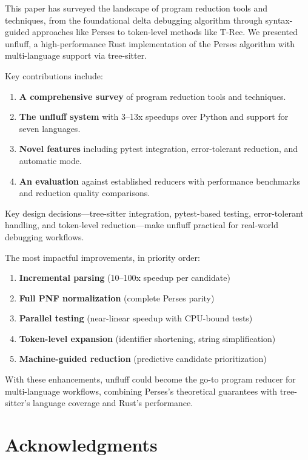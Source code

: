 \documentclass[
  letterpaper,
]{article}
\providecommand{\tightlist}{%
  \setlength{\itemsep}{0pt}\setlength{\parskip}{0pt}}
\begin{document}
This paper has surveyed the landscape of program reduction tools and
techniques, from the foundational delta debugging algorithm through
syntax-guided approaches like Perses to token-level methods like T-Rec.
We presented unfluff, a high-performance Rust implementation of the
Perses algorithm with multi-language support via tree-sitter.

Key contributions include:

\begin{enumerate}
\def\labelenumi{\arabic{enumi}.}
\tightlist
\item
  \textbf{A comprehensive survey} of program reduction tools and
  techniques.
\item
  \textbf{The unfluff system} with 3--13x speedups over Python and
  support for seven languages.
\item
  \textbf{Novel features} including pytest integration, error-tolerant
  reduction, and automatic mode.
\item
  \textbf{An evaluation} against established reducers with performance
  benchmarks and reduction quality comparisons.
\end{enumerate}

Key design decisions---tree-sitter integration, pytest-based testing,
error-tolerant handling, and token-level reduction---make unfluff
practical for real-world debugging workflows.

The most impactful improvements, in priority order:

\begin{enumerate}
\def\labelenumi{\arabic{enumi}.}
\tightlist
\item
  \textbf{Incremental parsing} (10--100x speedup per candidate)
\item
  \textbf{Full PNF normalization} (complete Perses parity)
\item
  \textbf{Parallel testing} (near-linear speedup with CPU-bound tests)
\item
  \textbf{Token-level expansion} (identifier shortening, string
  simplification)
\item
  \textbf{Machine-guided reduction} (predictive candidate
  prioritization)
\end{enumerate}

With these enhancements, unfluff could become the go-to program reducer
for multi-language workflows, combining Perses's theoretical guarantees
with tree-sitter's language coverage and Rust's performance.

\section{Acknowledgments}\label{acknowledgments}
\end{document}
